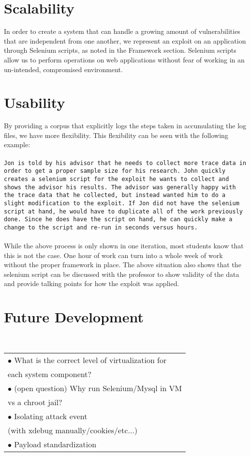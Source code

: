 \documentclass[letterpaper,twocolumn,10pt]{article}
\begin{document}
\section{Scalability}
In order to create a system that can handle a growing amount of vulnerabilities that are independent from one another, we represent an exploit on an application through  Selenium scripts, as noted in the Framework section.  Selenium scripts allow us to perform operations on web applications without fear of working in an un-intended, compromised environment. 

\section{Usability}
By providing a corpus that explicitly logs the steps taken in accumulating the log files, we have more flexibility.  This flexibility can be seen with the following example:  
\\\\
{\tt Jon is told by his advisor that he needs to collect more trace data in order to get a proper sample size for his research.  John quickly creates a selenium script for the exploit he wants to collect and shows the advisor his results.  The advisor was generally happy with the trace data that he collected, but instead wanted him to do a slight modification to the exploit.  If Jon did not have the selenium script at hand, he would have to duplicate all of the work previously done.  Since he does have the script on hand, he can quickly make a change to the script and re-run in seconds versus hours.}
\\\\
While the above process is only shown in one iteration, most students know that this is not the case.  One hour of work can turn into a whole week of work without the proper framework in place.  The above situation also shows that the selenium script can be discussed with the professor to show validity of the data and provide talking points for how the exploit was applied.


\section{Future Development}\\
 \begin{tabular} { l }
   $\bullet$ What is the correct level of virtualization for\\ each system component?\\
   $\bullet$ (open question) Why run Selenium/Mysql in VM\\ vs a chroot jail?\\
   $\bullet$ Isolating attack event \\(with xdebug manually/cookies/etc...)\\
   $\bullet$ Payload standardization
 \end{tabular}
\end{document}
